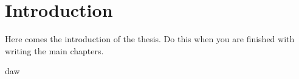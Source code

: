 \chapter*{Introduction}
{}

Here comes the introduction of the thesis. Do this when you are finished with writing the main chapters.

daw